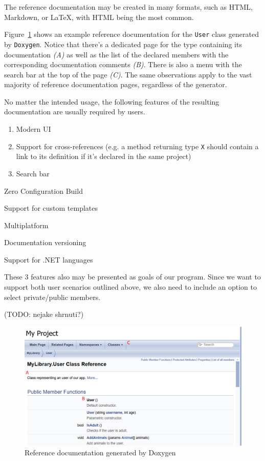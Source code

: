 The reference documentation may be created in many formats, such as HTML, Markdown, or LaTeX, with HTML being the most common.

Figure~\ref{fig:ref-doc-example} shows an example reference documentation for the \texttt{User} class generated by \texttt{Doxygen}.
Notice that there's a dedicated page for the type containing its documentation \textit{(A)} as well as the list of the declared members with the corresponding documentation comments \textit{(B)}. 
There is also a menu with the search bar at the top of the page \textit{(C)}.
The same observations apply to the vast majority of reference documentation pages, regardless of the generator.

No matter the intended usage, the following features of the resulting documentation are usually required by users.
\begin{enumerate}
    \item Modern UI
    \item Support for cross-references (e.g. a method returning type \texttt{X} should contain a link to its definition if it's declared in the same project)
    \item Search bar
\end{enumerate}

Zero Configuration Build

Support for custom templates

Multiplatform

Documentation versioning

Support for .NET languages

These 3 features also may be presented as goals of our program.
Since we want to support both user scenarios outlined above, we also need to include an option to select private/public members.

(TODO: nejake shrnuti?)

\begin{figure}
\centering
\includegraphics[width=1\linewidth]{img/ref-doc-example.png}
\caption{Reference documentation generated by Doxygen}
\label{fig:ref-doc-example}
\end{figure}

